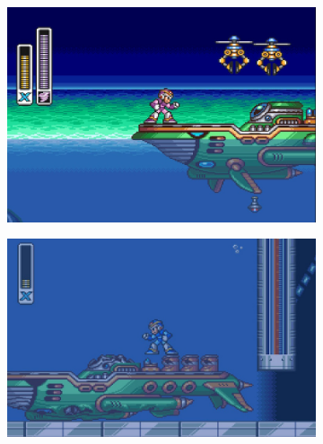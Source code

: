 \begin{figure}[htp]
	\centering
	\begin{subfigure}{0.37\textwidth}
		\centering
		\includegraphics[width=\linewidth]{figures/X1/Launch_octopus/Octopus_heart_1.jpg}
		\caption{}
	\end{subfigure}
	\begin{subfigure}{0.4\textwidth}
		\centering
		\includegraphics[width=\linewidth]{figures/X1/Launch_octopus/Octopus_heart_2.jpg}
		\caption{}
	\end{subfigure}\\
	\begin{subfigure}{0.4\textwidth}
		\centering

\end{subfigure}
\end{figure}
